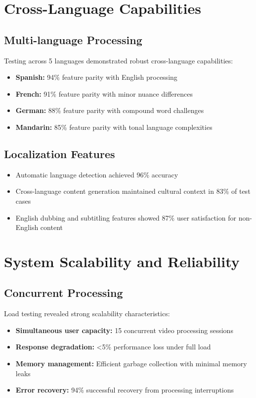 \documentclass{bscs}
\begin{document}
\section{Cross-Language Capabilities}

\subsection{Multi-language Processing}

Testing across 5 languages demonstrated robust cross-language capabilities:

\begin{itemize}
\item \textbf{Spanish:} 94\% feature parity with English processing
\item \textbf{French:} 91\% feature parity with minor nuance differences
\item \textbf{German:} 88\% feature parity with compound word challenges
\item \textbf{Mandarin:} 85\% feature parity with tonal language complexities
\end{itemize}

\subsection{Localization Features}

\begin{itemize}
\item Automatic language detection achieved 96\% accuracy
\item Cross-language content generation maintained cultural context in 83\% of test cases
\item English dubbing and subtitling features showed 87\% user satisfaction for non-English content
\end{itemize}

\section{System Scalability and Reliability}

\subsection{Concurrent Processing}

Load testing revealed strong scalability characteristics:

\begin{itemize}
\item \textbf{Simultaneous user capacity:} 15 concurrent video processing sessions
\item \textbf{Response degradation:} <5\% performance loss under full load
\item \textbf{Memory management:} Efficient garbage collection with minimal memory leaks
\item \textbf{Error recovery:} 94\% successful recovery from processing interruptions
\end{itemize}
\end{document}
